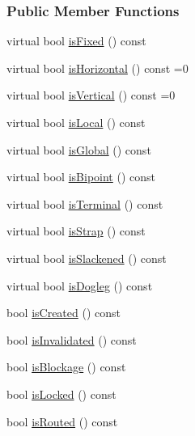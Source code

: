 \subsubsection*{Public Member Functions}
\begin{DoxyCompactItemize}
\item 
virtual bool \mbox{\hyperlink{classKite_1_1TrackElement_afd7362b850709bed8b61c1aa22399f97}{is\+Fixed}} () const
\item 
virtual bool \mbox{\hyperlink{classKite_1_1TrackElement_a9d3db1f8a5aca58f8f54d291faebf873}{is\+Horizontal}} () const =0
\item 
virtual bool \mbox{\hyperlink{classKite_1_1TrackElement_a6fa2bf0568a2b295dd7cd1f7207247d5}{is\+Vertical}} () const =0
\item 
virtual bool \mbox{\hyperlink{classKite_1_1TrackElement_add556a145a89fdbcea82346abfb873dc}{is\+Local}} () const
\item 
virtual bool \mbox{\hyperlink{classKite_1_1TrackElement_a19ba379112d6b29faa45c5eefbf38500}{is\+Global}} () const
\item 
virtual bool \mbox{\hyperlink{classKite_1_1TrackElement_a72741158d19af38e84c5e9c08f91270f}{is\+Bipoint}} () const
\item 
virtual bool \mbox{\hyperlink{classKite_1_1TrackElement_a1e074cb3064037035548e5e6d238e315}{is\+Terminal}} () const
\item 
virtual bool \mbox{\hyperlink{classKite_1_1TrackElement_a62d61c231cf404a814ae37665fa8164f}{is\+Strap}} () const
\item 
virtual bool \mbox{\hyperlink{classKite_1_1TrackElement_a782cff57d3fe10e758d19ee65a06643d}{is\+Slackened}} () const
\item 
virtual bool \mbox{\hyperlink{classKite_1_1TrackElement_a75d91371e5281dd21f60ff39ae70a3e5}{is\+Dogleg}} () const
\item 
bool \mbox{\hyperlink{classKite_1_1TrackElement_af7d9cf1d7581b1cab04cf38c64f0f72a}{is\+Created}} () const
\item 
bool \mbox{\hyperlink{classKite_1_1TrackElement_ac540608485240ff88970131ebc02c1ab}{is\+Invalidated}} () const
\item 
bool \mbox{\hyperlink{classKite_1_1TrackElement_a3fffa77f98cf6f0375f831bddce8a8fe}{is\+Blockage}} () const
\item 
bool \mbox{\hyperlink{classKite_1_1TrackElement_a43966e19963e4bcb7f7f9b5327ec732b}{is\+Locked}} () const
\item 
bool \mbox{\hyperlink{classKite_1_1TrackElement_a29202b7dfab21852f8c8d773de7b3728}{is\+Routed}} () const

\end{DoxyCompactItemize}
